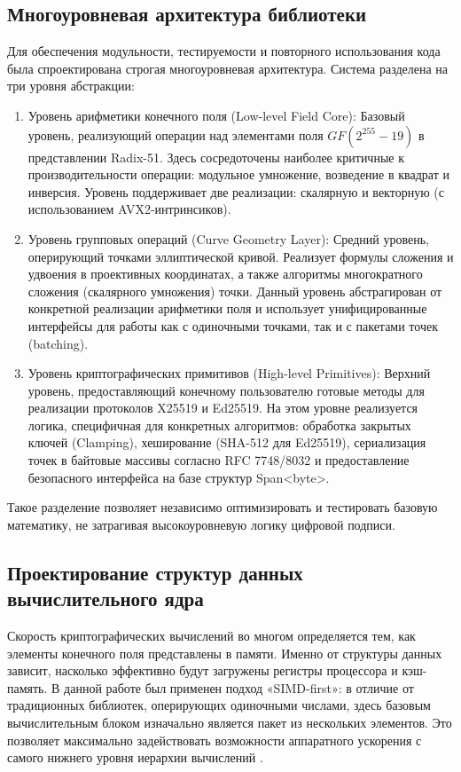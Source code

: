 \subsection{Многоуровневая архитектура библиотеки}

Для обеспечения модульности, тестируемости и повторного использования кода была спроектирована строгая многоуровневая архитектура. Система разделена на три уровня абстракции:

\begin{enumerate}
    \item Уровень арифметики конечного поля (Low-level Field Core): Базовый уровень, реализующий операции над элементами поля $GF(2^{255}-19)$ в представлении Radix-51. Здесь сосредоточены наиболее критичные к производительности операции: модульное умножение, возведение в квадрат и инверсия. Уровень поддерживает две реализации: скалярную и векторную (с использованием AVX2-интринсиков).
    
    \item Уровень групповых операций (Curve Geometry Layer): Средний уровень, оперирующий точками эллиптической кривой. Реализует формулы сложения и удвоения в проективных координатах, а также алгоритмы многократного сложения (скалярного умножения) точки. Данный уровень абстрагирован от конкретной реализации арифметики поля и использует унифицированные интерфейсы для работы как с одиночными точками, так и с пакетами точек (batching).
    
    \item Уровень криптографических примитивов (High-level Primitives): Верхний уровень, предоставляющий конечному пользователю готовые методы для реализации протоколов X25519 и Ed25519. На этом уровне реализуется логика, специфичная для конкретных алгоритмов: обработка закрытых ключей (Clamping), хеширование (SHA-512 для Ed25519), сериализация точек в байтовые массивы согласно RFC 7748/8032 и предоставление безопасного интерфейса на базе структур Span<byte>.
\end{enumerate}
Такое разделение позволяет независимо оптимизировать и тестировать базовую математику, не затрагивая высокоуровневую логику цифровой подписи.
\subsection{Проектирование структур данных вычислительного ядра}

Скорость криптографических вычислений во многом определяется тем, как элементы конечного поля представлены в памяти. Именно от структуры данных зависит, насколько эффективно будут загружены регистры процессора и кэш-память. 
В данной работе был применен подход «SIMD-first»: в отличие от традиционных библиотек, оперирующих одиночными числами, здесь базовым вычислительным блоком изначально является пакет из нескольких элементов. 
Это позволяет максимально задействовать возможности аппаратного ускорения с самого нижнего уровня иерархии вычислений \cite{DotNetPerformance}.


